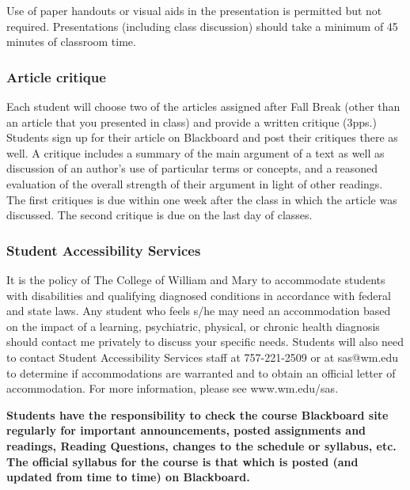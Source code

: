 \documentclass[doc,12pt]{apa6}
\begin{document}
Use of paper handouts or visual aids in the presentation is permitted
but not required. Presentations (including class discussion) should take
a minimum of 45 minutes of classroom time.

\subsubsection{Article critique}\label{article-critique}

Each student will choose two of the articles assigned after Fall Break
(other than an article that you presented in class) and provide a
written critique (3pps.) Students sign up for their article on
Blackboard and post their critiques there as well. A critique includes a
summary of the main argument of a text as well as discussion of an
author's use of particular terms or concepts, and a reasoned evaluation
of the overall strength of their argument in light of other readings.
The first critiques is due within one week after the class in which the
article was discussed. The second critique is due on the last day of
classes.

\subsubsection{Student Accessibility
Services}\label{student-accessibility-services}

It is the policy of The College of William and Mary to accommodate
students with disabilities and qualifying diagnosed conditions in
accordance with federal and state laws. Any student who feels s/he may
need an accommodation based on the impact of a learning, psychiatric,
physical, or chronic health diagnosis should contact me privately to
discuss your specific needs. Students will also need to contact Student
Accessibility Services staff at 757-221-2509 or at sas@wm.edu to
determine if accommodations are warranted and to obtain an official
letter of accommodation. For more information, please see
www.wm.edu/sas.

\vfill

\textbf{Students have the responsibility to check the course Blackboard
site regularly for important announcements, posted assignments and
readings, Reading Questions, changes to the schedule or syllabus, etc.
The official syllabus for the course is that which is posted (and
updated from time to time) on Blackboard.}
\end{document}

